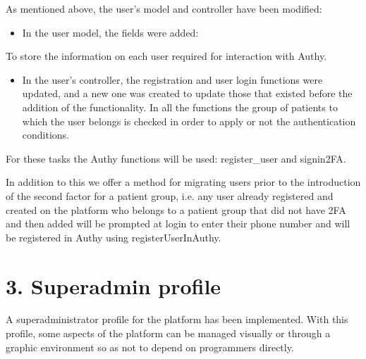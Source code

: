 \documentclass[letterpaper,10pt,english]{sphinxmanual}
\begin{document}
\begin{sphinxVerbatim}[commandchars=\\\{\}]
   
\end{sphinxVerbatim}

As mentioned above, the user’s model and controller have been modified:
\begin{itemize}
\item {} 
In the user model, the fields were added:

\end{itemize}

\begin{sphinxVerbatim}[commandchars=\\\{\}]
	\PYG{p}{[}\PYG{p}{]}
	 
\end{sphinxVerbatim}

To store the information on each user required for interaction with Authy.
\begin{itemize}
\item {} 
In the user’s controller, the registration and user login functions were updated, and a new one was created to update those that existed before the addition of the functionality.
In all the functions the group of patients to which the user belongs is checked in order to apply or not the authentication conditions.

\end{itemize}

For these tasks the Authy functions will be used: register\_user and signin2FA.

In addition to this we offer a method for migrating users prior to the introduction of the second factor for a patient group, i.e. any user already registered and created on the platform who belongs to a patient group that did not have 2FA and then added will be prompted at login to enter their phone number and will be registered in Authy using registerUserInAuthy.




\chapter{3. Superadmin profile}
\label{\detokenize{pages/Superadmin profile:superadmin-profile}}\label{\detokenize{pages/Superadmin profile::doc}}
A super\sphinxhyphen{}administrator profile for the platform has been implemented. With this profile, some aspects of the platform can be managed visually or through a graphic environment so as not to depend on programmers directly.
\end{document}
